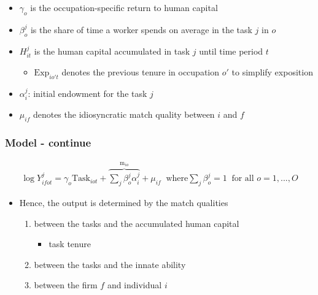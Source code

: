 \documentclass[10pt,svgnames,fragile]{beamer}
\begin{document}
{\begin{frame}
\begin{itemize}
		\item $\gamma_o$ is the occupation-specific return to human capital
		\item $\beta_{o}^{j} $ is the share of time a worker spends on average in the task $j$ in  $o$
		\item $H_{it}^j$ is the human capital accumulated in task $j$ until time period $t$
		\begin{itemize}
			\item $\text{Exp}_{io't}$ denotes the previous tenure in occupation $o'$ to simplify exposition
		\end{itemize}
		\item  $\alpha_{i}^j$: initial endowment for the task $j$
		\item $\mu_{if}$ denotes the idiosyncratic match quality between $i$ and $f$ 
		
	\end{itemize}
	
\end{frame}


\begin{frame}
	\frametitle{Model - continue}
	\begin{align}
		\log{Y_{ifot}^j} = \gamma_o{\text{Task}_{iot}} +{\overbrace{\sum_j \beta_{o}^j \alpha_{i}^j }^{\text{m}_{io}}}+\mu_{if} \;\;\text{where} \sum_{j} \beta_{o}^j = 1 \;\;\text{for all }o=1,...,O 
	\end{align}
	\begin{itemize}
		\vspace{3 mm}
		\item Hence, the output is determined by the match qualities
		\begin{enumerate}
			\vspace{1 mm}
			\item between the tasks and the accumulated human capital
			\begin{itemize}
				\item task tenure
			\end{itemize}
			\vspace{1 mm}
			\item  between the tasks and  the innate ability
			\vspace{1 mm}
			\item between the firm $f$ and individual $i$
		\end{enumerate}
	\end{itemize}
\end{frame}

}
\end{document}
